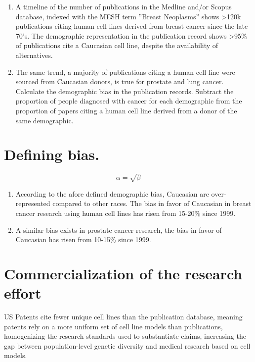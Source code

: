 \documentclass[11pt]{article}
\begin{document}
\begin{enumerate}
\item A timeline of the number of publications in the Medline and/or Scopus database, indexed with the MESH term ''Breast Neoplasms'' shows \textgreater 120k publications citing human cell lines derived from breast cancer since the late 70's. The demographic representation in the publication record shows \textgreater 95\% of publications cite a Caucasian cell line, despite the availability of alternatives. 

\item The same trend, a majority of publications citing a human cell line were sourced from Caucasian donors, is true for prostate and lung cancer. 
Calculate the demographic bias in the publication records. Subtract the proportion of people diagnosed with cancer for each demographic from the proportion of papers citing a human cell line derived from a donor of the same demographic. 
\end{enumerate}

\section{Defining bias.}

\begin{equation} \label{simple_equation}
    \alpha = \sqrt{ \beta }
\end{equation}

\begin{enumerate}
\item  According to the afore defined demographic bias, Caucasian are over-represented compared to other races. The bias in favor of Caucasian in breast cancer research using human cell lines has risen from 15-20\% since 1999.  
\item A similar bias exists in prostate cancer research, the bias in favor of Caucasian has risen from 10-15\% since 1999.
\end{enumerate}

\section{Commercialization of the research effort}
US Patents cite fewer unique cell lines than the publication database, meaning patents rely on a more uniform set of cell line models than publications, homogenizing the research standards used to substantiate claims, increasing the gap between population-level genetic diversity and medical research based on cell models. 
\end{document}
